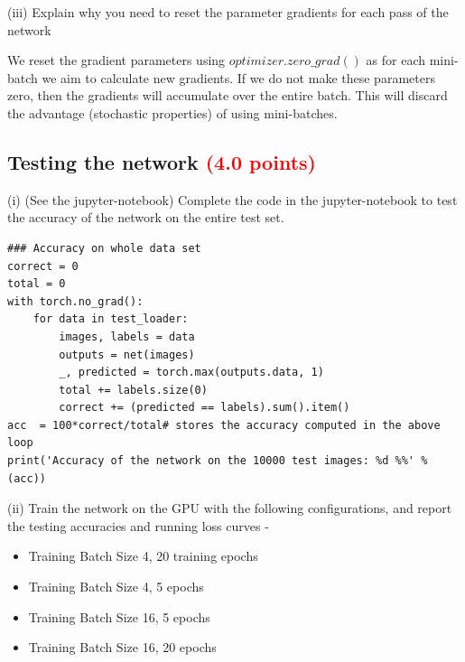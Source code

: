 \documentclass[answers]{exam}
\newcommand{\mypoints}[1]{\textcolor{red}{(#1 points)}}
\begin{document}
(iii) Explain why you need to reset the parameter gradients for each pass of the network
\begin{solution}
We reset the gradient parameters using $optimizer.zero\_grad()$ as for each mini-batch we aim to calculate new gradients. If we do not make these parameters zero, then the gradients will accumulate over the entire batch. This will discard the advantage (stochastic properties) of using mini-batches.
\end{solution}
\subsection{Testing the network \mypoints{4.0}}

(i) (See the jupyter-notebook) Complete the code in the jupyter-notebook to test the accuracy of the network on the entire test set. 
\begin{solution}
\begin{verbatim}
### Accuracy on whole data set
correct = 0
total = 0
with torch.no_grad():
    for data in test_loader:
        images, labels = data
        outputs = net(images)
        _, predicted = torch.max(outputs.data, 1)
        total += labels.size(0)
        correct += (predicted == labels).sum().item()
acc  = 100*correct/total# stores the accuracy computed in the above loop 
print('Accuracy of the network on the 10000 test images: %d %%' % (acc))
\end{verbatim}
\end{solution}
(ii) Train the network on the GPU with the following configurations, and report the testing accuracies and running loss curves -

\begin{itemize}
    \item Training Batch Size 4, 20 training epochs
    \item Training Batch Size 4, 5 epochs
    \item Training Batch Size 16, 5 epochs
    \item Training Batch Size 16, 20 epochs 
\end{itemize}
\end{document}
